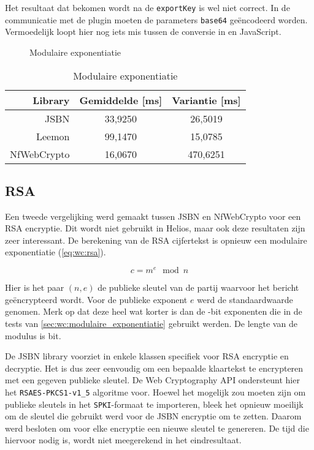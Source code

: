 \npar Het resultaat dat bekomen wordt na de \texttt{exportKey} is wel niet correct. In de communicatie met de plugin moeten de parameters \texttt{base64} ge\"encodeerd worden. Vermoedelijk loopt hier nog iets mis tussen de conversie in \cplusplus en JavaScript.

\begin{figure}
  \caption{Modulaire exponentiatie}
  \label{fig:wc:modular_exponentiation}
\end{figure}

\begin{table}
  \begin{center}
    \begin{tabular}{r | c c}
      Library & Gemiddelde [ms] & Variantie [ms] \\ \hline
      JSBN & 33,9250 & 26,5019  \\
      Leemon & 99,1470 & 15,0785 \\
      NfWebCrypto & 16,0670 & 470,6251
    \end{tabular}
    \caption{Modulaire exponentiatie}
    \label{tab:wc:modular_exponentiation}
  \end{center}
\end{table}

\subsection{RSA}

Een tweede vergelijking werd gemaakt tussen JSBN en NfWebCrypto voor een RSA encryptie. Dit wordt niet gebruikt in Helios, maar ook deze resultaten zijn zeer interessant. De berekening van de RSA cijfertekst is opnieuw een modulaire exponentiatie (\ref{eq:wc:rsa}).\cite{rivest_shamir_adleman_rsa}

\begin{equation}
  \label{eq:wc:rsa}
  c = m^e \mod{n}
\end{equation}

\npar Hier is het paar $(n, e)$ de publieke sleutel van de partij waarvoor het bericht ge\"encrypteerd wordt. Voor de publieke exponent $e$ werd de standaardwaarde  genomen. Merk op dat deze heel wat korter is dan de -bit exponenten die in de tests van \ref{sec:wc:modulaire_exponentiatie} gebruikt werden. De lengte van de modulus is  bit.

\npar De JSBN library voorziet in enkele klassen specifiek voor RSA encryptie en decryptie. Het is dus zeer eenvoudig om een bepaalde klaartekst te encrypteren met een gegeven publieke sleutel. De Web Cryptography API ondersteunt hier het \texttt{RSAES-PKCS1-v1\_5} algoritme voor.\cite{rfc3447} Hoewel het mogelijk zou moeten zijn om publieke sleutels in het \texttt{SPKI}-formaat te importeren, bleek het opnieuw moeilijk om de sleutel die gebruikt werd voor de JSBN encryptie om te zetten. Daarom werd besloten om voor elke encryptie een nieuwe sleutel te genereren. De tijd die hiervoor nodig is, wordt niet meegerekend in het eindresultaat.

